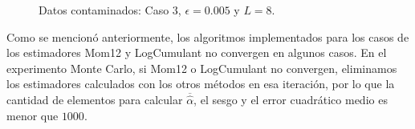 \begin{figure}[H]
	\caption{\label{Caso3L8}\small Datos contaminados: Caso $3$, $\epsilon=0.005$ y $ L=8$.}
\end{figure}

Como se mencionó anteriormente, los algoritmos implementados para los casos de los estimadores Mom12 y LogCumulant no convergen en algunos casos. En el experimento Monte Carlo, si Mom12 o LogCumulant no convergen, eliminamos los estimadores calculados con los otros métodos en esa iteración, por lo que la cantidad de elementos para calcular $\overline{\widehat{\alpha}}$, el sesgo y el error cuadrático medio es menor que $1000$.

